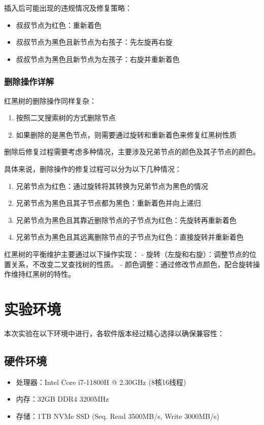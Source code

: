 \documentclass[12pt,a4paper]{article}
\begin{document}
插入后可能出现的违规情况及修复策略：
\begin{itemize}
\item 叔叔节点为红色：重新着色
\item 叔叔节点为黑色且新节点为右孩子：先左旋再右旋
\item 叔叔节点为黑色且新节点为左孩子：右旋并重新着色
\end{itemize}

\subsubsection{删除操作详解}
红黑树的删除操作同样复杂：
\begin{enumerate}
\item 按照二叉搜索树的方式删除节点
\item 如果删除的是黑色节点，则需要通过旋转和重新着色来修复红黑树性质
\end{enumerate}

删除后修复过程需要考虑多种情况，主要涉及兄弟节点的颜色及其子节点的颜色。

具体来说，删除操作的修复过程可以分为以下几种情况：
\begin{enumerate}
\item 兄弟节点为红色：通过旋转将其转换为兄弟节点为黑色的情况
\item 兄弟节点为黑色且其子节点都为黑色：重新着色并向上递归
\item 兄弟节点为黑色且其靠近删除节点的子节点为红色：先旋转再重新着色
\item 兄弟节点为黑色且其远离删除节点的子节点为红色：直接旋转并重新着色
\end{enumerate}

红黑树的平衡维护主要通过以下操作实现：
- 旋转（左旋和右旋）：调整节点的位置关系，不改变二叉查找树的性质。
- 颜色调整：通过修改节点颜色，配合旋转操作维持红黑树的特性。

\section{实验环境}
本次实验在以下环境中进行，各软件版本经过精心选择以确保兼容性：

\subsection{硬件环境}
\begin{itemize}
\item 处理器：Intel Core i7-11800H @ 2.30GHz (8核16线程)
\item 内存：32GB DDR4 3200MHz
\item 存储：1TB NVMe SSD (Seq. Read 3500MB/s, Write 3000MB/s)
\end{itemize}
\end{document}

